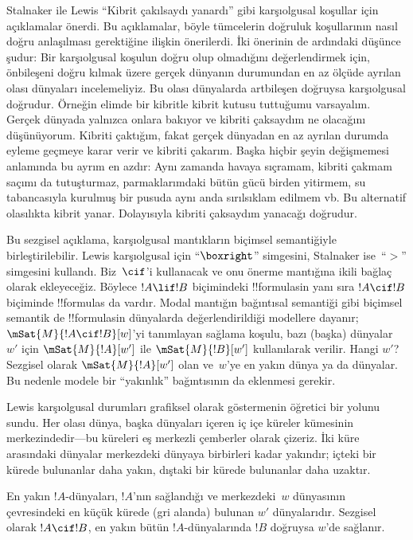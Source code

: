 \documentclass[../../../include/open-logic-section]{subfiles}
\begin{document}


Stalnaker ile Lewis ``Kibrit çakılsaydı yanardı'' gibi karşıolgusal koşullar
için açıklamalar önerdi. Bu açıklamalar, böyle tümcelerin doğruluk
koşullarının nasıl doğru anlaşılması gerektiğine ilişkin önerilerdi. İki
önerinin de ardındaki düşünce şudur: Bir karşıolgusal koşulun doğru olup
olmadığını değerlendirmek için, önbileşeni doğru kılmak üzere gerçek dünyanın
durumundan en az ölçüde ayrılan olası dünyaları incelemeliyiz. Bu olası
dünyalarda artbileşen doğruysa karşıolgusal doğrudur. Örneğin elimde bir
kibritle kibrit kutusu tuttuğumu varsayalım. Gerçek dünyada yalnızca onlara
bakıyor ve kibriti çaksaydım ne olacağını düşünüyorum. Kibriti çaktığım, fakat
gerçek dünyadan en az ayrılan durumda eyleme geçmeye karar verir ve kibriti
çakarım. Başka hiçbir şeyin değişmemesi anlamında bu ayrım en azdır: Aynı
zamanda havaya sıçramam, kibriti çakmam saçımı da tutuşturmaz, parmaklarımdaki
bütün gücü birden yitirmem, su tabancasıyla kurulmuş bir pusuda aynı anda
sırılsıklam edilmem vb. Bu alternatif olasılıkta kibrit yanar. Dolayısıyla
kibriti çaksaydım yanacağı doğrudur.

Bu sezgisel açıklama, karşıolgusal mantıkların biçimsel semantiğiyle
birleştirilebilir. Lewis karşıolgusal için ``$\boxright$'' simgesini,
Stalnaker ise~``$>$'' simgesini kullandı. Biz~$\cif$'i kullanacak ve onu
önerme mantığına ikili bağlaç olarak ekleyeceğiz. Böylece $!A\lif !B$
biçimindeki !!{formula}s{}in yanı sıra $!A\cif !B$ biçiminde !!{formula}s da
vardır. Modal mantığın bağıntısal semantiği gibi biçimsel semantik de
!!{formula}s{}in dünyalarda değerlendirildiği modellere dayanır;
$\mSat{M}{!A\cif !B}[w]$'yi tanımlayan sağlama koşulu, bazı (başka)
dünyalar~$w'$ için $\mSat{M}{!A}[w']$ ile $\mSat{M}{!B}[w']$ kullanılarak
verilir. Hangi $w'$? Sezgisel olarak $\mSat{M}{!A}[w']$ olan ve~$w$'ye en
yakın dünya ya da dünyalar. Bu nedenle modele bir ``yakınlık'' bağıntısının
da eklenmesi gerekir.

Lewis karşıolgusal durumları grafiksel olarak göstermenin öğretici bir
yolunu sundu. Her olası dünya, başka dünyaları içeren iç içe küreler
kümesinin merkezindedir---bu küreleri eş merkezli çemberler olarak çizeriz.
İki küre arasındaki dünyalar merkezdeki dünyaya birbirleri kadar yakındır;
içteki bir kürede bulunanlar daha yakın, dıştaki bir kürede bulunanlar daha
uzaktır.
\begin{center}
\end{center}
En yakın $!A$-dünyaları, $!A$'nın sağlandığı ve merkezdeki~$w$ dünyasının
çevresindeki en küçük kürede (gri alanda) bulunan $w'$ dünyalarıdır.
Sezgisel olarak $!A\cif !B$, en yakın bütün $!A$-dünyalarında $!B$ doğruysa
$w$'de sağlanır.
\end{document}

